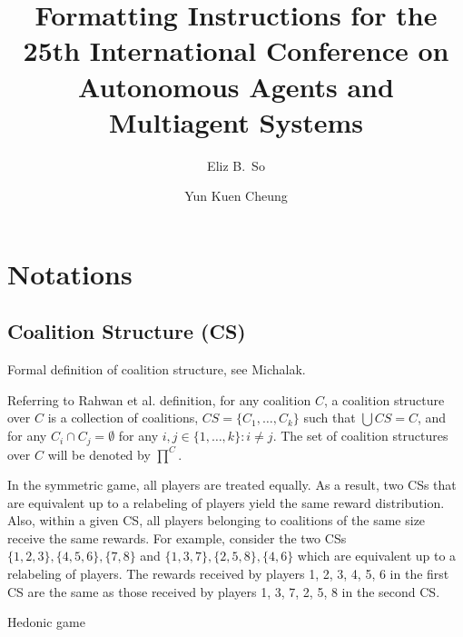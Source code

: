 \documentclass[sigconf,anonymous]{aamas}
\title[AAMAS-2026 Formatting Instructions]{Formatting Instructions for the 25th International Conference on Autonomous Agents and Multiagent Systems}
\author{Eliz B.~So}
\affiliation{
  \institution{Australian National University}
  \city{Canberra}
  \country{Australia }}
\author{Yun Kuen Cheung}
\affiliation{
  \institution{Australian National University}
  \city{Canberra}
  \country{Australia}}
\newcommand{\ykc}[1]{{\color{blue} #1}}
\begin{document}

\pagestyle{fancy}
\fancyhead{}


\maketitle 





\section{Notations}


\subsection{Coalition Structure (CS)}

\ykc{Formal definition of coalition structure, see Michalak.}

Referring to Rahwan et al. definition, for any coalition $C$, a coalition structure over $C$ is a collection of coalitions, $CS = \{ C_1, \dots, C_k\}$ such that $\bigcup CS = C$, and for any $C_i \cap C_j = \emptyset$ for any $i, j \in \{1, \dots, k\}:i\neq j$. The set of coalition structures over $C$ will be denoted by $\prod^C$.

In the symmetric game, all players are treated equally. As a result, two CSs that are equivalent up to a relabeling of players yield the same reward distribution. Also, within a given CS, all players belonging to coalitions of the same size receive the same rewards. For example, consider the two CSs $\{1, 2, 3\}, \{4, 5, 6\}, \{7, 8\}$ and $\{1, 3, 7\}, \{2, 5, 8\}, \{4, 6\}$ which are equivalent up to a relabeling of players. The rewards received by players 1, 2, 3, 4, 5, 6 in the first CS are the same as those received by players
1, 3, 7, 2, 5, 8 in the second CS.


\ykc{Hedonic game}
\end{document}
